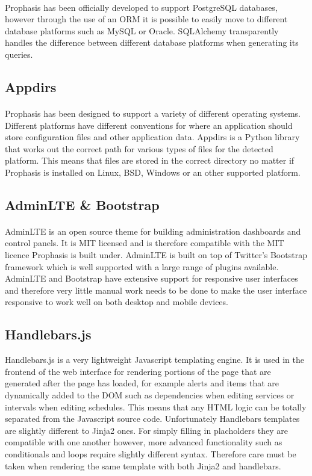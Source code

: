 \documentclass[bsc,logo,twoside]{infthesis}
\begin{document}
\paragraph*{}
	Prophasis has been officially developed to support PostgreSQL databases,
	however through the use of an ORM it is possible to easily move to different
	database platforms such as MySQL or Oracle.  SQLAlchemy transparently handles
	the difference between different database platforms when generating its
	queries.
	
\subsection{Appdirs}
\paragraph*{}
	Prophasis has been designed to support a variety of different operating
	systems.  Different platforms have different conventions for where an
	application should store configuration files and other application data.
	Appdirs is a Python library that works out the correct path for various types
	of files for the detected platform.  This means that files are stored in the
	correct directory no matter if Prophasis is installed on Linux, BSD, Windows
	or an other supported platform.

\subsection{AdminLTE \& Bootstrap}
\paragraph*{}
	AdminLTE is an open source theme for building administration dashboards and
	control panels.  It is MIT licensed and is therefore compatible with the MIT
	licence Prophasis is built under.  AdminLTE is built on top of Twitter's
	Bootstrap framework which is well supported with a large range of plugins
	available.  AdminLTE and Bootstrap have extensive support for responsive user
	interfaces and therefore very little manual work needs to be done to make the
	user interface responsive to work well on both desktop and mobile devices.

\subsection{Handlebars.js}
	Handlebars.js is a very lightweight Javascript templating engine.  It is used
	in the frontend of the web interface for rendering portions of the page that
	are generated after the page has loaded, for example alerts and items that are
	dynamically added to the DOM such as dependencies when editing services or
	intervals when editing schedules.  This means that any HTML logic can be
	totally separated from the Javascript source code.  Unfortunately Handlebars
	templates are slightly different to Jinja2 ones.  For simply filling in
	placholders they are compatible with one another however, more advanced
	functionality such as conditionals and loops require slightly different syntax.
	Therefore care must be taken when rendering the same template with both Jinja2
	and handlebars.
\end{document}
